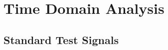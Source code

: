 \setchapterpreamble[u]{\margintoc}
\chapter[Time Domain Analysis ($5^{th}$ and $6^{th}$ Lectures)]{Time Domain Analysis}

\section{Standard Test Signals}

\blindtext

